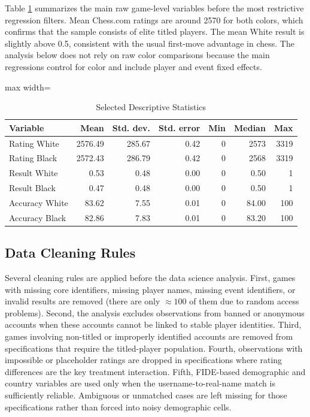 Table \ref{tab:metadata-summary} summarizes the main raw game-level variables before the most restrictive regression filters. Mean Chess.com ratings are around 2570 for both colors, which confirms that the sample consists of elite titled players. The mean White result is slightly above 0.5, consistent with the usual first-move advantage in chess. The analysis below does not rely on raw color comparisons because the main regressions control for color and include player and event fixed effects.

\begin{table}[H]
\centering
\caption{Selected Descriptive Statistics}
\label{tab:metadata-summary}
\begin{adjustbox}{max width=\textwidth}
\begin{tabular}{lrrrrrr}
\toprule
Variable & Mean & Std. dev. & Std. error & Min & Median & Max \\
\midrule
Rating White & 2576.49 & 285.67 & 0.42 & 0 & 2573 & 3319 \\
Rating Black & 2572.43 & 286.79 & 0.42 & 0 & 2568 & 3319 \\
Result White & 0.53 & 0.48 & 0.00 & 0 & 0.50 & 1 \\
Result Black & 0.47 & 0.48 & 0.00 & 0 & 0.50 & 1 \\
Accuracy White & 83.62 & 7.55 & 0.01 & 0 & 84.00 & 100 \\
Accuracy Black & 82.86 & 7.83 & 0.01 & 0 & 83.20 & 100 \\
\bottomrule
\end{tabular}
\end{adjustbox}
\end{table}

\subsection{Data Cleaning Rules}

Several cleaning rules are applied before the data science analysis. First, games with missing core identifiers, missing player names, missing event identifiers, or invalid results are removed (there are only $\approx100$ of them due to random access problems). Second, the analysis excludes observations from banned or anonymous accounts when these accounts cannot be linked to stable player identities. Third, games involving non-titled or improperly identified accounts are removed from specifications that require the titled-player population. Fourth, observations with impossible or placeholder ratings are dropped in specifications where rating differences are the key treatment interaction. Fifth, FIDE-based demographic and country variables are used only when the username-to-real-name match is sufficiently reliable. Ambiguous or unmatched cases are left missing for those specifications rather than forced into noisy demographic cells.

